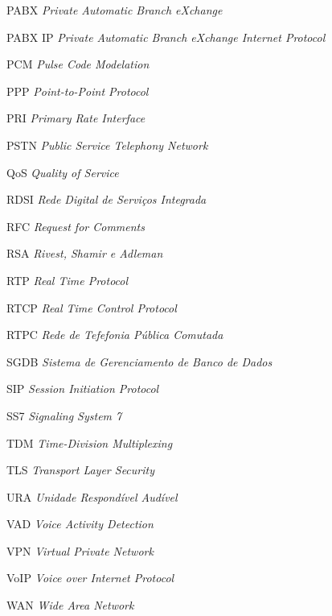\documentclass[12pt,openright,oneside,a4paper,brazil]{abntex2}
\begin{document}
\begin{siglas}
  \item[PABX]	 \textit{Private Automatic Branch eXchange}
  \item[PABX IP] \textit{Private Automatic Branch eXchange Internet Protocol}
  \item[PCM]	 \textit{Pulse Code Modelation}
  \item[PPP]	 \textit{Point-to-Point Protocol}
  \item[PRI]	 \textit{Primary Rate Interface}
  \item[PSTN]	 \textit{Public Service Telephony Network}
  \item[QoS]	 \textit{Quality of Service}
  \item[RDSI]	 \textit{Rede Digital de Serviços Integrada}
  \item[RFC]	 \textit{Request for Comments}
  \item[RSA]	 \textit{Rivest, Shamir e Adleman}
  \item[RTP]	 \textit{Real Time Protocol}
  \item[RTCP]	 \textit{Real Time Control Protocol}
  \item[RTPC]	 \textit{Rede de Tefefonia Pública Comutada}
  \item[SGDB]	 \textit{Sistema de Gerenciamento de Banco de Dados}
  \item[SIP]	 \textit{Session Initiation Protocol}
  \item[SS7]	 \textit{Signaling System 7}
  \item[TDM]	 \textit{Time-Division Multiplexing}
  \item[TLS]	 \textit{Transport Layer Security}
  \item[URA]	 \textit{Unidade Respondível Audível}
  \item[VAD]	 \textit{Voice Activity Detection}
  \item[VPN]	 \textit{Virtual Private Network}
  \item[VoIP]	 \textit{Voice over Internet Protocol}
  \item[WAN]	 \textit{Wide Area Network}
\end{siglas}
\end{document}
